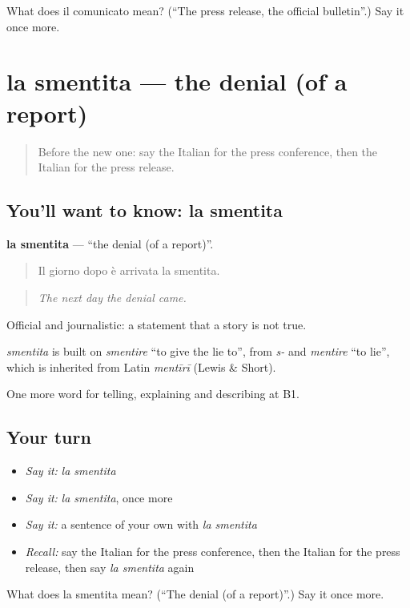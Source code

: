 \begin{tcolorbox}[breakable,colback=teal!4,colframe=teal!35!black,title={Before you move on}]
What does il comunicato mean? (\textquotedblleft{}The press release, the official bulletin\textquotedblright{}.) Say it once more.
\end{tcolorbox}
\section[la smentita]{la smentita — the denial (of a report)}

\label{lesson:IT-C285-smentita}



\begin{quote}
Before the new one: say the Italian for the press conference, then the Italian for the press release.
\end{quote}

\subsection*{You'll want to know: la smentita}
\textbf{la smentita} — \textquotedblleft{}the denial (of a report)\textquotedblright{}.

\begin{quote}
Il giorno dopo è arrivata la smentita.
\end{quote}

\begin{quote}
\emph{The next day the denial came.}
\end{quote}

Official and journalistic: a statement that a story is not true.

\begin{cousinweb}
\emph{smentita} is built on \emph{smentire} \textquotedblleft{}to give the lie to\textquotedblright{}, from \emph{s-} and \emph{mentire} \textquotedblleft{}to lie\textquotedblright{}, which is inherited from Latin \emph{mentīrī} (Lewis \& Short).
\end{cousinweb}

\begin{grammarlens}[title={What you've built}]
One more word for telling, explaining and describing at B1.
\end{grammarlens}

\subsection*{Your turn}
\begin{itemize}
\raggedright
  \item \emph{Say it:} \emph{la smentita}
  \item \emph{Say it:} \emph{la smentita}, once more
  \item \emph{Say it:} a sentence of your own with \emph{la smentita}
  \item \emph{Recall:} say the Italian for the press conference, then the Italian for the press release, then say \emph{la smentita} again
\end{itemize}

\begin{tcolorbox}[breakable,colback=teal!4,colframe=teal!35!black,title={Before you move on}]
What does la smentita mean? (\textquotedblleft{}The denial (of a report)\textquotedblright{}.) Say it once more.
\end{tcolorbox}
